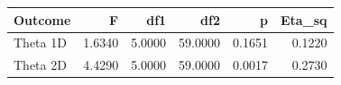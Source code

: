 \begin{tabular}{lrrrrr}
  \toprule
Outcome & F & df1 & df2 & p & Eta_sq \\ 
  \midrule
Theta 1D & 1.6340 & 5.0000 & 59.0000 & 0.1651 & 0.1220 \\ 
  Theta 2D & 4.4290 & 5.0000 & 59.0000 & 0.0017 & 0.2730 \\ 
   \bottomrule
\end{tabular}
